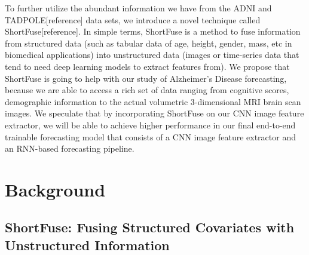 \documentclass[12pt]{article}
\begin{document}
To further utilize the abundant information we have from the ADNI and TADPOLE[reference] data sets, we introduce a novel technique called ShortFuse[reference]. In simple terms, ShortFuse is a method to fuse information from structured data (such as tabular data of age, height, gender, mass, etc in biomedical applications) into unstructured data (images or time-series data that tend to need deep learning models to extract features from). We propose that ShortFuse is going to help with our study of Alzheimer's Disease forecasting, because we are able to access a rich set of data ranging from cognitive scores, demographic information to the actual volumetric 3-dimensional MRI brain scan images. We speculate that by incorporating ShortFuse on our CNN image feature extractor, we will be able to achieve higher performance in our final end-to-end trainable forecasting model that consists of a CNN image feature extractor and an RNN-based forecasting pipeline. 


\section{Background}

\subsection{ShortFuse: Fusing Structured Covariates with  Unstructured Information}
\end{document}
